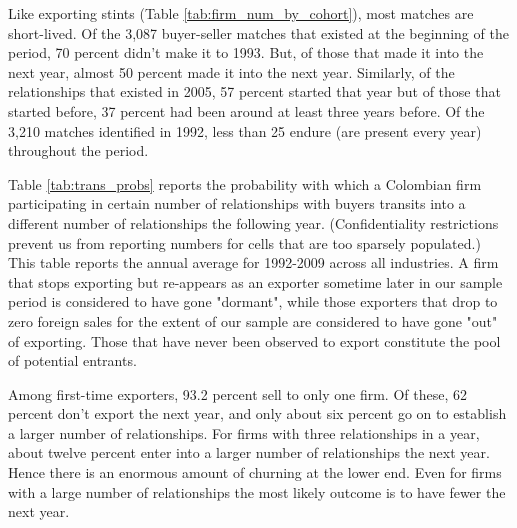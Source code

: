 \documentclass[12pt,titlepage]{article}
\begin{document}
Like exporting stints (Table \ref{tab:firm_num_by_cohort}), most matches are
short-lived. Of the 3,087 buyer-seller matches that existed at the beginning
of the period, 70 percent didn't make it to 1993. But, of those that made it
into the next year, almost 50 percent made it into the next year. Similarly,
of the relationships that existed in 2005, 57 percent started that year but
of those that started before, 37 percent had been around at least three
years before. Of the 3,210 matches identified in 1992, less than 25 endure
(are present every year) throughout the period.

Table \ref{tab:trans_probs} reports the probability with which a Colombian
firm participating in certain number of relationships with buyers transits
into a different number of relationships the following year.
(Confidentiality restrictions prevent us from reporting numbers for cells
that are too sparsely populated.) This table reports the annual average for
1992-2009 across all industries. A firm that stops exporting but re-appears
as an exporter sometime later in our sample period is considered to have
gone "dormant", while those exporters that drop to zero foreign sales for
the extent of our sample are considered to have gone "out" of exporting.
Those that have never been observed to export constitute the pool of
potential entrants.

Among first-time exporters, 93.2 percent sell to only one firm. Of these, 62
percent don't export the next year, and only about six percent go on to
establish a larger number of relationships. For firms with three
relationships in a year, about twelve percent enter into a larger number of
relationships the next year. Hence there is an enormous amount of churning
at the lower end. Even for firms with a large number of relationships the
most likely outcome is to have fewer the next year.
\end{document}
